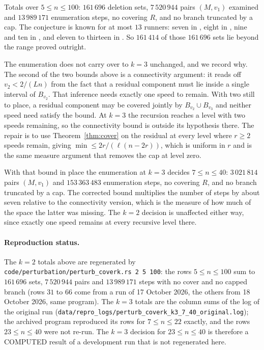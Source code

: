 \documentclass[11pt]{amsart}
\theoremstyle{plain}
\theoremstyle{definition}
\begin{document}
Totals over $5\le n\le100$: $161\,696$ deletion sets, $7\,520\,944$ pairs $(M,v_1)$ examined and
$13\,989\,171$ enumeration steps,
no covering $R$, and no branch truncated by a cap. The conjecture is known for at most $13$
runners: seven in \cite{bs}, eight in \cite{rosenfeld}, nine and ten in \cite{trak}, and eleven to
thirteen in \cite{st}. So $161\,414$ of those $161\,696$ sets lie beyond the range proved outright.

The enumeration does not carry over to $k=3$ unchanged, and we record why. The second of the two
bounds above is a connectivity argument: it reads off $v_2<2/(Ln)$ from the fact that a residual
component must lie inside a single interval of $B_{v_2}$. That inference needs exactly one speed to
remain. With two still to place, a residual component may be covered jointly by
$B_{v_2}\cup B_{v_3}$ and neither speed need satisfy the bound. At $k=3$ the recursion reaches a
level with two speeds remaining, so the connectivity bound is outside its hypothesis there. The
repair is to use Theorem~\ref{thm:cover} on the residual at every level where $r\ge2$ speeds remain,
giving $\min\le 2r/(\ell(n-2r))$, which is uniform in $r$ and is the same measure argument that
removes the cap at level zero.

With that bound in place the enumeration at $k=3$ decides $7\le n\le40$: $3\,021\,814$ pairs
$(M,v_1)$ and $153\,363\,483$ enumeration steps, no covering $R$, and no branch truncated by a cap.
The corrected bound multiplies the number of steps by about seven relative to the connectivity
version, which is the measure of how much of the space the latter was missing. The $k=2$ decision is
unaffected either way, since exactly one speed remains at every recursive level there.

\paragraph{Reproduction status.} The $k=2$ totals above are regenerated by \texttt{code/perturbation/perturb\_coverk.rs 2 5 100}: the rows $5\le n\le100$ sum to $161\,696$ sets, $7\,520\,944$ pairs and $13\,989\,171$ steps with no cover and no capped branch (rows $31$ to $66$ come from a run of 17 October 2026, the others from 18 October 2026, same program). The $k=3$ totals are the column sums of the log of the original run (\texttt{data/repro\_logs/perturb\_coverk\_k3\_7\_40\_original.log}); the archived program reproduced its rows for $7\le n\le22$ exactly, and the rows $23\le n\le40$ were not re-run. The $k=3$ decision for $23\le n\le40$ is therefore a COMPUTED result of a development run that is not regenerated here.
\end{document}
